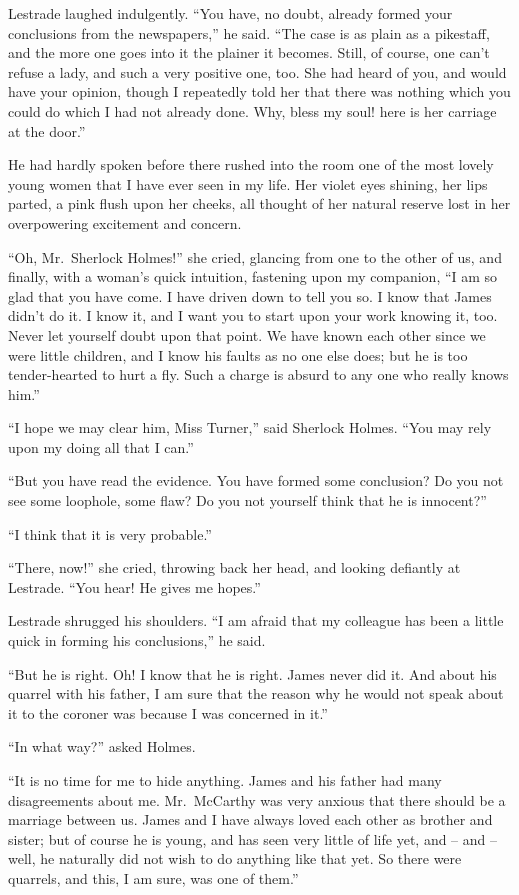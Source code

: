 Lestrade laughed indulgently. “You have, no doubt, already
formed your conclusions from the newspapers,” he said.
“The case is as plain as a pikestaff, and the more one goes
into it the plainer it becomes. Still, of course, one can’t refuse
a lady, and such a very positive one, too. She had heard
of you, and would have your opinion, though I repeatedly told
her that there was nothing which you could do which I had
not already done. Why, bless my soul! here is her carriage
at the door.”

He had hardly spoken before there rushed into the room
one of the most lovely young women that I have ever seen
in my life. Her violet eyes shining, her lips parted, a pink
flush upon her cheeks, all thought of her natural reserve lost
in her overpowering excitement and concern.

“Oh, Mr.~Sherlock Holmes!” she cried, glancing from one
to the other of us, and finally, with a woman’s quick intuition,
fastening upon my companion, “I am so glad that you have
come. I have driven down to tell you so. I know that James
didn’t do it. I know it, and I want you to start upon your
work knowing it, too. Never let yourself doubt upon that
point. We have known each other since we were little children,
and I know his faults as no one else does; but he is too
tender-hearted to hurt a fly. Such a charge is absurd to any
one who really knows him.”

“I hope we may clear him, Miss Turner,” said Sherlock
Holmes. “You may rely upon my doing all that I can.”

“But you have read the evidence. You have formed some
conclusion? Do you not see some loophole, some flaw? Do
you not yourself think that he is innocent?”

“I think that it is very probable.”

“There, now!” she cried, throwing back her head, and
looking defiantly at Lestrade. “You hear! He gives me
hopes.”

Lestrade shrugged his shoulders. “I am afraid that my
colleague has been a little quick in forming his conclusions,”
he said.

“But he is right. Oh! I know that he is right. James
never did it. And about his quarrel with his father, I am sure
that the reason why he would not speak about it to the coroner
was because I was concerned in it.”

“In what way?” asked Holmes.

“It is no time for me to hide anything. James and his
father had many disagreements about me. Mr.~McCarthy was
very anxious that there should be a marriage between us.
James and I have always loved each other as brother and sister;
but of cou\-rse he is young, and has seen very little of life
yet, and -- and -- well, he naturally did not wish to do anything
like that yet. So there were quarrels, and this, I am sure, was
one of them.”

